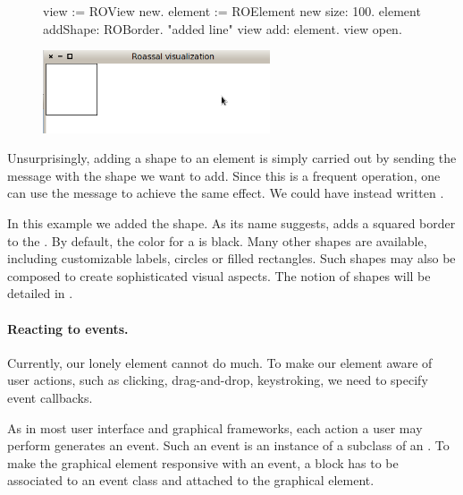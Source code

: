 \documentclass[a4paper,10pt,twoside]{book}
\begin{document}
\begin{figure}[H]
      \begin{minipage}[t]{0.5\textwidth}
      \vspace{0pt}
\begin{code}{}
view := ROView new.
element := ROElement new size: 100.
element addShape: ROBorder. "added line"
view add: element.
view open.
\end{code}
   \end{minipage}
   \hfill
   \begin{minipage}[t]{0.6\textwidth}
      \vspace{0pt} \raggedright
       \centering
		\includegraphics[width=0.6\textwidth]{ex2}
   \end{minipage}
\label{fig:ex2}
\end{figure}

Unsurprisingly, adding a shape to an element is simply carried out by sending the  message with the shape we want to add. Since this is a frequent operation, one can use the \ct{+} message to achieve the same effect. We could have instead written . 

In this example we added the  shape. As its name suggests,  adds a squared border to the . By default, the color for a  is black. Many other shapes are available, including customizable labels, circles or filled rectangles. Such shapes may also be composed to create sophisticated visual aspects. The notion of shapes will be detailed in .

\paragraph{Reacting to events.}
Currently, our lonely element cannot do much. To make our element aware of user actions, such as clicking, drag-and-drop, keystroking, we need to specify event callbacks. 

As in most user interface and graphical frameworks, each action a user may perform generates an event. Such an event is an instance of a subclass of an . To make the graphical element responsive with an event, a block has to be associated to an event class and attached to the graphical element.
\end{document}
